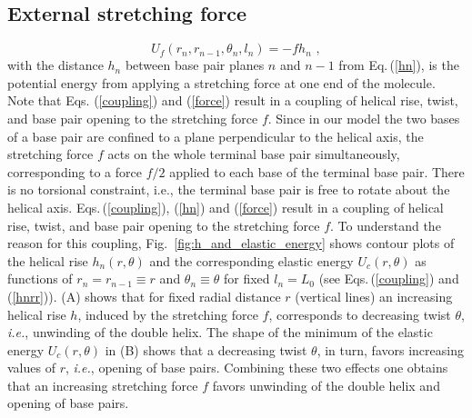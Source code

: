 \documentclass[12pt,masters,final]{UTRGVthesis}
\begin{document}
\subsection{External stretching force}
%
  \begin{equation} \label{force}
  U_f(r_n,r_{n-1},\theta_n,l_n) = - f h_n \, \, ,
  \end{equation}
  with the distance $h_n$ between base pair planes $n$ and $n-1$ from Eq.\,(\ref{hn}),
  is the potential energy from applying a stretching force at one end of
  the molecule. Note that Eqs. (\ref{coupling}) and (\ref{force}) result in a coupling
  of helical rise, twist, and base pair opening to the stretching force $f$.
  Since in our model the two bases of a base pair are confined to a plane
  perpendicular to the helical axis, the stretching force $f$ acts on the whole terminal
  base pair simultaneously, corresponding to a force $f/2$ applied to each base of the
  terminal base pair. 
  There is no torsional constraint, i.e., the terminal base pair is free to rotate
  about the helical axis. Eqs.\,(\ref{coupling}), (\ref{hn}) and (\ref{force}) result in a coupling of helical rise,
  twist, and base pair opening to the stretching force $f$. To understand the reason for this
  coupling, Fig.~\ref{fig:h_and_elastic_energy} shows contour plots of the helical rise
  $h_n(r,\theta)$ and the corresponding elastic energy $U_c(r,\theta)$ as functions of
  $r_n = r_{n-1} \equiv r$ and $\theta_n \equiv \theta$ for fixed $l_n = L_0$
  (see Eqs.\,(\ref{coupling}) and (\ref{hnrr})).
  (A) shows that for fixed radial distance $r$ (vertical lines) an increasing helical rise $h$,
  induced by the stretching force $f$, corresponds to decreasing twist $\theta$, {\em i.e.},
  unwinding of the double helix. The shape of the minimum of the elastic energy $U_c(r,\theta)$
  in (B) shows that a decreasing twist $\theta$, in turn, favors increasing values of $r$,
  {\em i.e.}, opening of base pairs. Combining these two effects one obtains that an increasing
  stretching force $f$ favors unwinding of the double helix and opening of base pairs.\\ 
%
\newpage
\end{document}
